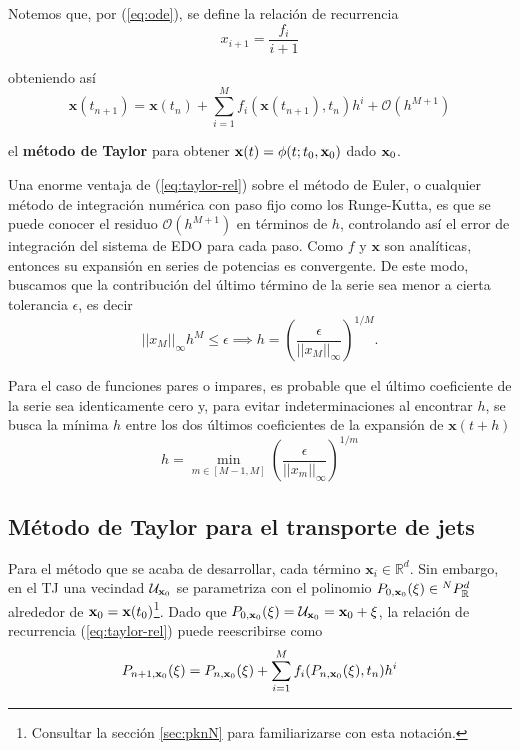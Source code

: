 Notemos que, por (\ref{eq:ode}), se define la relación de recurrencia
\begin{equation}
x_{i+1} = \frac{f_i}{i+1}
\label{eq:rec-rel}
\end{equation}

obteniendo así 
\begin{equation}
\mathbf{x}(t_{n+1}) = \mathbf{x}(t_n) + \sum_{i=1}^M f_i(\mathbf{x}(t_{n+1}),t_n)h^i + \mathcal{O}(h^{M+1})
\label{eq:taylor-rel}
\end{equation}

el \textbf{método de Taylor} para obtener $\mathbf{x}(t) = \phi(t;t_0,\mathbf{x}_0)$ dado $\mathbf{x}_0$.

Una enorme ventaja de (\ref{eq:taylor-rel}) sobre el método de Euler, o cualquier método de integración numérica con paso fijo como los Runge-Kutta, es que se puede conocer el residuo $\mathcal{O}(h^{M+1})$ en términos de $h$, controlando así el error de integración del sistema de EDO para cada paso. Como $f$ y $\mathbf{x}$ son analíticas, entonces su expansión en series de potencias es convergente. De este modo, buscamos que la contribución del último término de la serie sea menor a cierta tolerancia $\epsilon$, es decir
\begin{equation*}
||x_M||_\infty h^M \leq \epsilon \implies h = \left( \frac{\epsilon}{||x_M||_\infty} \right)^{1/M}.
\end{equation*} 

Para el caso de funciones pares o impares, es probable que el último coeficiente de la serie sea identicamente cero y, para evitar indeterminaciones al encontrar $h$, se busca la mínima $h$ entre los dos últimos coeficientes de la expansión de $\mathbf{x}(t+h)$
\begin{equation}
h = \min_{m \in [M-1,M]}{ \left( \frac{\epsilon}{||x_m||_\infty} \right)^{1/m} }
\label{eq:stepsize}
\end{equation} 

\subsection{Método de Taylor para el transporte de jets}
Para el método que se acaba de desarrollar, cada término $\mathbf{x}_i \in \mathbb{R}^d$. Sin embargo, en el TJ una vecindad $\mathcal{U}_{\mathbf{x}_0}$ se parametriza con el polinomio $P_{0,\mathbf{x}_0}(\mathbf{\xi}) \in {^{N}P_{\mathbb{R}}^ d }$ alrededor de $\mathbf{x}_0 = \mathbf{x}(t_0)$\footnote{Consultar la sección \ref{sec:pknN} para familiarizarse con esta notación.}. Dado que $P_{0,\mathbf{x}_0}(\mathbf{\xi}) = \mathcal{U}_{\mathbf{x}_0} = \mathbf{x}_0 + \mathbf{\xi}$, la relación de recurrencia (\ref{eq:taylor-rel}) puede reescribirse como
\begin{equation}
P_{n+1,\mathbf{x}_0}(\xi) = P_{n,\mathbf{x}_0}(\xi) + \sum_{i=1}^M f_i(P_{n,\mathbf{x}_0}(\xi),t_n)h^i 
\label{eq:jt-rel}
\end{equation}

